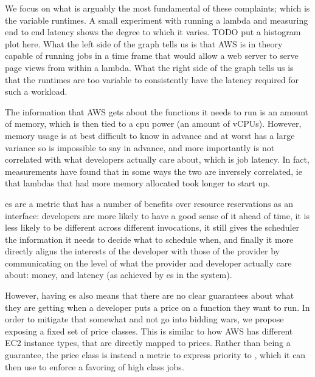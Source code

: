 We focus on what is arguably the most fundamental of these complaints; which is
the variable runtimes. A small experiment with running a lambda and measuring
end to end latency shows the degree to which it varies. TODO put a histogram
plot here. What the left side of
the graph tells us is that AWS is in theory capable of running jobs in a time
frame that would allow a web server to serve page views from within a lambda.
What the right side of the graph tells us is that the runtimes are too variable
to consistently have the latency required for such a workload.

The information that AWS gets about the functions it needs to run is an amount
of memory, which is then tied to a cpu power (an amount of vCPUs). However,
memory usage is at best difficult to know in advance and at worst has a large
variance so is impossible to say in advance, and more importantly is not
correlated with what developers actually care about, which is job latency. In
fact, measurements have found that in some ways the two are inversely
correlated, ie that lambdas that had more memory allocated took longer to start
up. 

\Priceclass{}es are a metric that has a number of benefits over resource
reservations as an interface: developers are more likely to have a good sense of
it ahead of time, it is less likely to be different across different
invocations, it still gives the scheduler the information it needs to decide
what to schedule when, and finally it more directly aligns the interests of the
developer with those of the provider by communicating on the level of what the
provider and developer actually care about: money, and latency (as achieved by
\class{}es in the system).


However, having \priceclass{}es also means that there are no clear guarantees
about what they are getting when a developer puts a price on a function they
want to run. In order to mitigate that somewhat and not go into bidding wars, we
propose exposing a fixed set of price classes. This is similar to how AWS has
different EC2 instance types, that are directly mapped to prices. Rather than
being a guarantee, the price class is instead a metric to express priority to
\sys{}, which it can then use to enforce a favoring of high class jobs. 